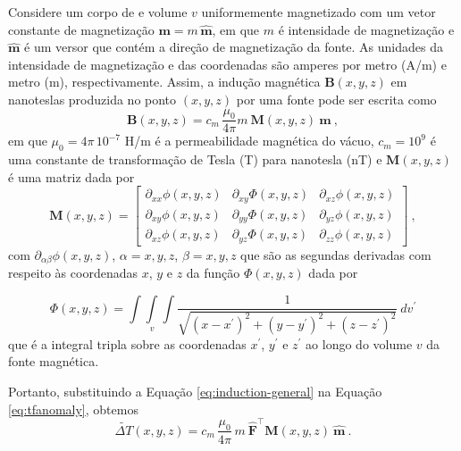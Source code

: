 Considere um corpo de e volume $v$ uniformemente magnetizado com um vetor constante de magnetização $\mathbf{m} = m \, \hat{\mathbf{m}}$, em que $ m $ é intensidade de magnetização e $ \hat{\mathbf{m}} $ é um versor que contém a direção de magnetização da fonte. 
As unidades da intensidade de magnetização e das coordenadas são amperes por metro (A/m) e metro (m), respectivamente. 
Assim, a indução magnética $\mathbf{B}(x, y, z)$ em nanoteslas produzida no ponto $(x, y, z)$ por uma fonte pode ser escrita como
\begin{equation}
\mathbf{B}(x, y, z) = c_{m} \, \frac{\mu_{0}}{4\pi}m \: \mathbf{M}(x, y, z) \: 
\hat{\mathbf{m}} \: ,
\label{eq:induction-general}
\end{equation}
em que $\mu_{0} = 4\pi \, 10^{-7}$ H/m é a permeabilidade magnética do vácuo, 
$c_{m} = 10^{9}$ é uma constante de transformação de Tesla (T) para nanotesla (nT) e $\mathbf{M}(x, y, z)$ é uma matriz dada por
\begin{equation}
\mathbf{M}(x, y, z) =
\left[
\begin{array}{ccc}
\partial_{xx} \phi(x, y, z) & \partial_{xy} \Phi(x, y, z) & 
\partial_{xz} \phi(x, y, z) \\
\partial_{xy} \phi(x, y, z) & \partial_{yy} \Phi(x, y, z) & 
\partial_{yz} \phi(x, y, z) \\
\partial_{xz} \phi(x, y, z) & \partial_{yz} \Phi(x, y, z) & 
\partial_{zz} \phi(x, y, z)
\end{array}
\right] \: ,
\label{eq:M}
\end{equation}
com $\partial_{\alpha\beta} \phi(x, y, z)$, $\alpha = x, y, z$, 
$\beta = x, y, z$ que são as segundas derivadas com respeito às coordenadas $x$, $y$ e $z$ da função $\Phi(x,y,z)$ dada por

\begin{equation}
\Phi(x,y,z) = \int\int\limits_{v}\int \frac{1}{\sqrt{(x - x^{\prime})^{2} + 
		(y - y^{\prime})^{2} + (z - z^{\prime})^{2}}} \: dv^{\prime}
\label{eq:phi}
\end{equation}
que é a integral tripla sobre as coordenadas $x^{\prime}$, $y^{\prime}$ 
e $z^{\prime}$ ao longo do volume $v$ da fonte magnética.

Portanto, substituindo a Equação \ref{eq:induction-general} na Equação \ref{eq:tfanomaly}, obtemos
\begin{equation}
\tilde{\Delta T}(x, y, z) = c_{m} \, \frac{\mu_{0}}{4\pi} \, m \: \hat{\mathbf{F}}^{\top} 
\mathbf{M}(x, y, z) \: \hat{\mathbf{m}} \: .
\label{eq:tfanomaly-general}
\end{equation}

